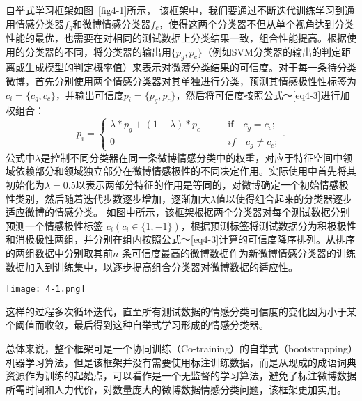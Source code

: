 自举式学习框架如图~\ref{fig4-1}所示，
该框架中，我们要通过不断迭代训练学习到通用情感分类器$ f_{g} $和微博情感分类器$ f_{c} $，使得这两个分类器不但从单个视角达到分类性能的最优，也需要在对相同的测试数据上分类结果一致，组合性能提高。根据使用的分类器的不同，将分类器的输出用$  \lbrace p_{g},p_{c}\rbrace$（例如SVM分类器的输出的判定距离或生成模型的判定概率值）来表示对微薄分类结果的可信度。对于每一条待分类微博，首先分别使用两个情感分类器对其单独进行分类，预测其情感极性性标签为$ c_{i}=\lbrace c_{g},c_{c}\rbrace $，并输出可信度$ p_{i}= \lbrace p_{g},p_{c}\rbrace$，然后将可信度按照公式～\ref{eq4-3}进行加权组合：
\begin{equation}
\label{eq4-3}
p_{i}=\begin{cases}
\lambda\ast p_{g} + \left( 1-\lambda \right) \ast p_{c}&  \qquad \mbox{if} \quad c_{g}=c_{c};\\
0&  \qquad \textit{if} \quad c_{g} \neq c_{c};
\end{cases}.
\end{equation}
公式中$ \lambda $是控制不同分类器在同一条微博情感分类中的权重，对应于特征空间中领域依赖部分和领域独立部分在微博情感极性的不同决定作用。实际使用中首先将其初始化为$ \lambda = 0.5 $以表示两部分特征的作用是等同的，对微博确定一个初始情感极性类别，然后随着迭代步数逐步增加，逐渐加大$ \lambda $值以使得组合起来的分类器逐步适应微博的情感分类。
如图中所示，该框架根据两个分类器对每个测试数据分别预测一个情感极性标签 $ c_{i} \left( c_{i} \in \lbrace 1, -1\rbrace \right)$，根据预测标签将测试数据分为积极极性和消极极性两组，并分别在组内按照公式～\ref{eq4-3}计算的可信度降序排列。从排序的两组数据中分别取其前$ n $ 条可信度最高的微博数据作为新微博情感分类器的训练数据加入到训练集中，以逐步提高组合分类器对微博数据的适应性。

\begin{landscape}
\begin{figure*}[htp] 
\centering%
\texttt{[image: 4-1.png]}
\caption{自举式学习框架}
\label{fig4-1}
\end{figure*}
\end{landscape}

这样的过程多次循环迭代，直至所有测试数据的情感分类可信度的变化因为小于某个阈值而收敛，最后得到这种自举式学习形成的情感分类器。

总体来说，整个框架可是一个协同训练（Co-training）的自举式（bootstrapping）机器学习算法，但是该框架并没有需要使用标注训练数据，而是从现成的成语词典资源作为训练的起始点，可以看作是一个无监督的学习算法，避免了标注微博数据所需时间和人力代价，对数量庞大的微博数据情感分类问题，该框架更加实用。

